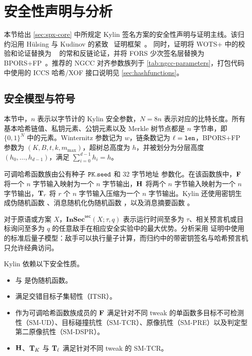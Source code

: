 \section{安全性声明与分析}
\label{sec:security-claims}

\providecommand{\InSec}[1]{\mathbf{InSec}^{\mathsf{#1}}}
\providecommand{\csenc}{\mathsf{cs\text{-}wots\text{-}encode}}
\providecommand{\Chain}{\mathsf{chain}}
\providecommand{\THFColl}{\mathcal{T}_{\mathsf{H}}}

本节给出 \cref{sec:spx-core} 中所规定 Kylin 签名方案的安全性声明与证明主线。该归约沿用
H\"ulsing 与 Kudinov 的紧致 \SPHINCSP\ 证明框架~\cite{AC:HulKud22}。
同时，证明将 WOTS+ 中的校验和论证替换为 \WOTSCS~\cite{optimalwots} 的常和反链论证，并将 FORS 少次签名层替换为 BPORS+FP~\cite{bucketthinning,EPRINT:AbrKat25}。推荐的 NGCC 对齐参数族列于
\cref{tab:ngcc-parameters}，打包代码中使用的 ICCS 哈希/XOF 接口说明见 \cref{sec:hashfunctions}。

\subsection{安全模型与符号}
\label{sec:proof-model}

本节中，$n$ 表示以字节计的 Kylin 安全参数，$N=8n$ 表示对应的比特长度。所有基本哈希链值、私钥元素、公钥元素以及 Merkle 树节点都是 $n$ 字节串，即 $\{0,1\}^{N}$ 中的元素。Winternitz 参数记为 $w$，\WOTSCS 链条数记为 $\ell=\mathtt{len}$，BPORS+FP 参数为 $(K,B,t,k,m_{\max})$，超树总高度为 $h$，并被划分为分层高度 $(h_0,\ldots,h_{d-1})$，满足 $\sum_{i=0}^{d-1}h_i=h$。

可调哈希函数族由公有种子 $\pk.\seed$ 和 32 字节地址 \ADRS 参数化。在该函数族中，$\mathbf{F}$ 将一个 $n$ 字节输入映射为一个 $n$ 字节输出，$\mathbf{H}$ 将两个 $n$ 字节输入映射为一个 $n$ 字节输出，$\mathbf{T}_r$ 将 $r$ 个 $n$ 字节输入压缩为一个 $n$ 字节输出。Kylin 还使用密钥生成伪随机函数 \PRF、消息随机化伪随机函数 \PRFmsg，以及消息摘要函数 \hashmsg。

对于原语或方案 $X$，$\InSec{sec}(X;\tau,q)$ 表示运行时间至多为 $\tau$、相关预言机或目标询问至多为 $q$ 的任意敌手在相应安全实验中的最大优势。分析采用 \SPHINCSP 证明中使用的标准后量子模型：敌手可以执行量子计算，而归约中的带密钥签名与哈希预言机只允许经典访问。

Kylin 依赖以下安全性质。
\begin{itemize}
    \item \PRF 与 \PRFmsg 是伪随机函数。
    \item \hashmsg 满足交错目标子集韧性（ITSR）。
    \item 作为可调哈希函数族成员的 $\mathbf{F}$ 满足针对不同 tweak 的单函数多目标不可检测性（SM-UD）、目标碰撞抗性（SM-TCR）、原像抗性（SM-PRE）以及判定型第二原像抗性（SM-DSPR）。
    \item $\mathbf{H}$、$\mathbf{T}_K$ 与 $\mathbf{T}_\ell$ 满足针对不同 tweak 的 SM-TCR。
\end{itemize}

